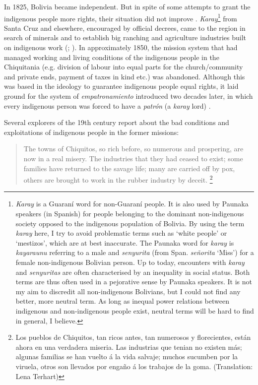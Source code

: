 In 1825, Bolivia became independent. But in spite of some attempts to grant the indigenous people more rights, their situation did not improve \citep[cf.][165--168]{Tonelli2004}. \textit{Karay}\footnote{\textit{Karay} is a Guaraní word for non-Guaraní people. It is also used by Paunaka speakers (in Spanish) for people belonging to the dominant non-indigenous society opposed to the indigenous population of Bolivia. By using the term \textit{karay} here, I try to avoid problematic terms such as ‘white people’ or ‘mestizos’, which are at best inaccurate. The Paunaka word for \textit{karay} is \textit{kayaraunu} referring to a male and \textit{senyurita} (from Span. \textit{señorita} ‘Miss’) for a female non-indigenous Bolivian person. Up to today, encounters with \textit{karay} and \textit{senyuritas} are often characterised by an inequality in social status. Both terms are thus often used in a pejorative sense by Paunaka speakers. It is not my aim to discredit all non-indigenous Bolivians, but I could not find any better, more neutral term. As long as inequal power relations between indigenous and non-indigenous people exist, neutral terms will be hard to find in general, I believe.}
 from Santa Cruz and elsewhere, encouraged by official decrees, came to the region in search of minerals and to establish big ranching and agriculture industries built on indigenous work  (\citealt[56]{APCOB_Saberes}; \citealt[172, 197, 199]{Tonelli2004}). In approximately 1850, the mission system that had managed working and living conditions of the indigenous people in the Chiquitania (e.g. division of labour into equal parts for the church/community and private ends, payment of taxes in kind etc.) was abandoned. Although this was based in the ideology to guarantee indigenous people equal rights, it laid ground for the system of \textit{em\-pa\-tro\-na\-mien\-to} introduced two decades later, in which every indigenous person was forced to have a \textit{patrón} (a \textit{karay} lord) \citep[191--192]{Tonelli2004}.

Several explorers of the 19th century report about the bad conditions and exploitations of indigenous people in the former missions:

\begin{quotation}
The towns of Chiquitos, so rich before, so numerous and prospering, are now in a real misery. The industries that they had ceased to exist; some families have returned to the savage life; many are carried off by pox, others are brought to work in the rubber industry by deceit. \citep[299]{Cardus1886}\footnote{Los pueblos de Chiquitos, tan ricos antes, tan numerosos y florecientes, están ahora en una verdadera miseria. Las industrias que tenian no existen más; algunas familias se han vuelto á la vida salvaje; muchos sucumben por la viruela, otros son llevados por engaño á los trabajos de la goma. (Translation: Lena Terhart)}\end{quotation}

